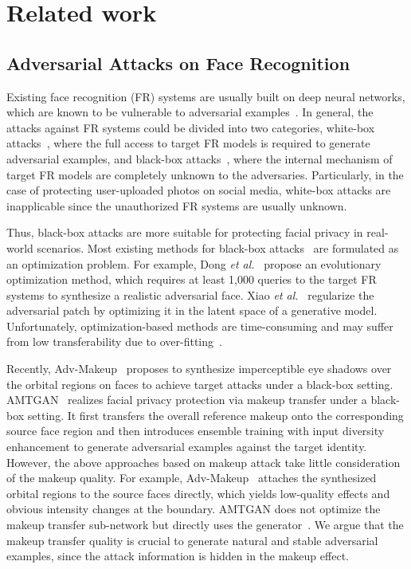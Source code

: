\documentclass[10pt,journal,compsoc]{IEEEtran}
\begin{document}
\section{Related work}
\label{sec:relate}
\subsection{Adversarial Attacks on Face Recognition}%
Existing face recognition (FR) systems are usually built on deep neural networks, which are known to be vulnerable to adversarial examples~\cite{szegedy2013intriguing,goodfellow2014explaining,dong2019efficient,xiao2021improving}. In general, the attacks against FR systems could be divided into two categories, white-box attacks~\cite{goodfellow2014explaining,hu2021advhash,madry2017towards}, where the full access to target FR models is required to generate adversarial examples, and black-box attacks~\cite{dong2018boosting,xiao2021improving,yang2021towards,zhong2020towards}, where the internal mechanism of target FR models are completely unknown to the adversaries. Particularly, in the case of protecting user-uploaded photos on social media, white-box attacks are inapplicable since the unauthorized FR systems are usually unknown.

Thus, black-box attacks are more suitable for protecting facial privacy in real-world scenarios. Most existing methods for black-box attacks~\cite{dong2018boosting,dong2019efficient} are formulated as an optimization problem. 
For example, Dong \emph{et al.}~\cite{dong2019efficient} propose an evolutionary optimization method, which requires at least 1,000 queries to the target FR systems to synthesize a realistic adversarial face. Xiao \emph{et al.}~\cite{xiao2021improving} regularize the adversarial patch by optimizing it in the latent space of a generative model.
Unfortunately, optimization-based methods are time-consuming and may suffer from low transferability due to over-fitting~\cite{xiao2021improving}. 

Recently, Adv-Makeup~\cite{yin2021adv} proposes to synthesize imperceptible eye shadows over the orbital regions on faces to achieve target attacks under a black-box setting. AMTGAN~\cite{hu2022protecting} realizes facial privacy protection via makeup transfer under a black-box setting. It first transfers the overall reference makeup onto the corresponding source face region and then introduces ensemble training with input diversity enhancement to generate adversarial examples against the target identity. However, the above approaches based on makeup attack take little consideration of the makeup quality. For example, Adv-Makeup~\cite{yin2021adv} attaches the synthesized orbital regions to the source faces directly, which yields low-quality effects and obvious intensity changes at the boundary. AMTGAN\cite{hu2022protecting} does not optimize the makeup transfer sub-network but directly uses the generator~\cite{jiang2020psgan}. We argue that the makeup transfer quality is crucial to generate natural and stable adversarial examples, since the attack information is hidden in the makeup effect. 
\end{document}
